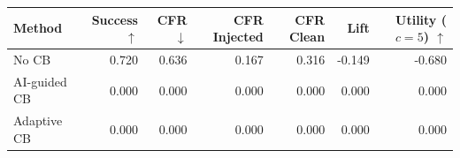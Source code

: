 \begin{tabular}{lrrrrrr}
\toprule
Method & Success $\uparrow$ & CFR $\downarrow$ & CFR Injected & CFR Clean & Lift & Utility ($c=5$) $\uparrow$ \\
\midrule
No CB & 0.720 & 0.636 & 0.167 & 0.316 & -0.149 & -0.680 \\
AI-guided CB & 0.000 & 0.000 & 0.000 & 0.000 & 0.000 & 0.000 \\
Adaptive CB & 0.000 & 0.000 & 0.000 & 0.000 & 0.000 & 0.000 \\
\bottomrule
\end{tabular}
